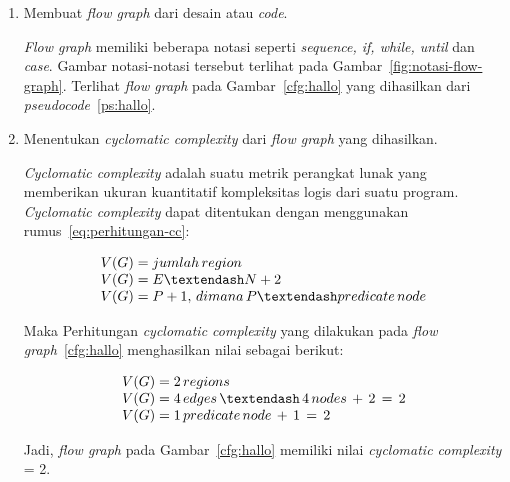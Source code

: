 \begin{enumerate}[
leftmargin=0pt, itemindent=20pt,
labelwidth=15pt, labelsep=5pt, listparindent=0.7cm,
align=left]
\item Membuat \emph{flow graph} dari desain atau \emph{code}.

  \emph{Flow graph} memiliki beberapa notasi seperti \emph{sequence,
    if, while, until} dan \emph{case}. Gambar notasi-notasi tersebut
  terlihat pada Gambar~\ref{fig:notasi-flow-graph}. Terlihat \emph{flow graph}
  pada Gambar~\ref{cfg:hallo} yang dihasilkan dari
  \emph{pseudocode}~\ref{ps:hallo}.

\item Menentukan \emph{cyclomatic complexity} dari \emph{flow graph}
  yang dihasilkan.

  \emph{Cyclomatic complexity} adalah suatu metrik perangkat lunak
  yang memberikan ukuran kuantitatif kompleksitas logis dari suatu
  program. \emph{Cyclomatic complexity} dapat ditentukan dengan menggunakan
  rumus~\ref{eq:perhitungan-cc}:

  \begin{equation}
    \begin{array}{l}
      V(G) = jumlah \thinspace region \\
      V(G) = E – N + 2 \\
      V(G) = P + 1, \thinspace di mana \thinspace P – predicate \thinspace node
    \end{array}\label{eq:perhitungan-cc}
  \end{equation}

  Maka Perhitungan \emph{cyclomatic complexity} yang dilakukan pada
  \emph{flow graph}~\ref{cfg:hallo} menghasilkan
  nilai sebagai berikut:

  \begin{equation}
    \begin{array}{l}
      V(G) = 2 \thinspace regions \\
      V(G) = 4 \thinspace edges \thinspace – \thinspace 4 \thinspace
      nodes \thinspace + \thinspace 2 \thinspace = \thinspace 2 \\
      V(G) = 1 \thinspace predicate \thinspace node \thinspace +
      \thinspace 1 \thinspace = \thinspace 2
    \end{array}\label{eq:hasil-perhitungan-cc}
  \end{equation}

 Jadi, \emph{flow graph} pada Gambar~\ref{cfg:hallo} memiliki nilai
 \emph{cyclomatic complexity} = 2.


\end{enumerate}
